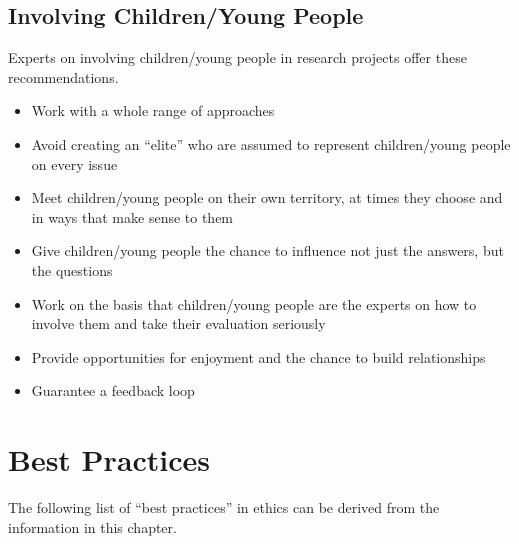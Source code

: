 \subsection{Involving Children/Young People}

Experts on involving children/young people in research projects offer these recommendations.

\begin{itemize}
	\item Work with a whole range of approaches

	\item Avoid creating an ``elite'' who are assumed to represent children/young people on every issue

	\item Meet children/young people on their own territory, at times they choose and in ways that make sense to them

	\item Give children/young people the chance to influence not just the answers, but the questions

	\item Work on the basis that children/young people are the experts on how to involve them and take their evaluation seriously

	\item Provide opportunities for enjoyment and the chance to build relationships

	\item Guarantee a feedback loop

\end{itemize}

\section{Best Practices}

The following list of ``best practices'' in ethics can be derived from the information in this chapter.

